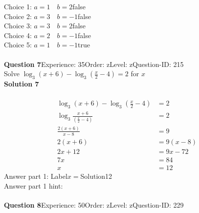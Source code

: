 \documentclass{article}
\begin{document}
Choice 1: \hspace{20pt}$a=1\quad b=2$\hspace{20pt}false\\
Choice 2: \hspace{20pt}$a=3 \quad b=-1$\hspace{20pt}false\\
Choice 3: \hspace{20pt}$a=3 \quad b=2$\hspace{20pt}false\\
Choice 4: \hspace{20pt}$a=2 \quad b=-1$\hspace{20pt}false\\
Choice 5: \hspace{20pt}$a=1 \quad b=-1$\hspace{20pt}true\\
\\[4pt]
\noindent\textbf{Question 7}\hspace{20pt}Experience: 35\hspace{20pt}Order: z\hspace{20pt}Level: z\hspace{20pt}Question-ID: 215\\[2pt]
Solve $\log_{3}(x+6)-\log_{3}\left(\displaystyle\frac{x}{2}-4\right)=2$ for $x$\\[4pt]
\noindent\textbf{Solution 7}\\[2pt]
\\[-35pt]\begin{align*}
\log_{3}(x+6)-\log_{3}\left(\displaystyle\frac{x}{2}-4\right)&=2\\[2pt]
\log_{3}\displaystyle\frac{x+6}{\left(\displaystyle\frac{x}{2}-4\right)}&=2\\[2pt]
\displaystyle\frac{2(x+6)}{x-8}&=9\\[2pt]
2(x+6)&=9(x-8)\\[2pt]
2x+12&=9x-72\\[2pt]
7x&=84\\[2pt]
x&=12
\end{align*}
Answer part 1: \hspace{10pt}Label\hspace{10pt}$x=$\hspace{10pt}Solution\hspace{10pt}12\\
Answer part 1 hint: \hspace{15pt}\\
\\[4pt]
\noindent\textbf{Question 8}\hspace{20pt}Experience: 50\hspace{20pt}Order: z\hspace{20pt}Level: z\hspace{20pt}Question-ID: 229\\[2pt]
\end{document}
